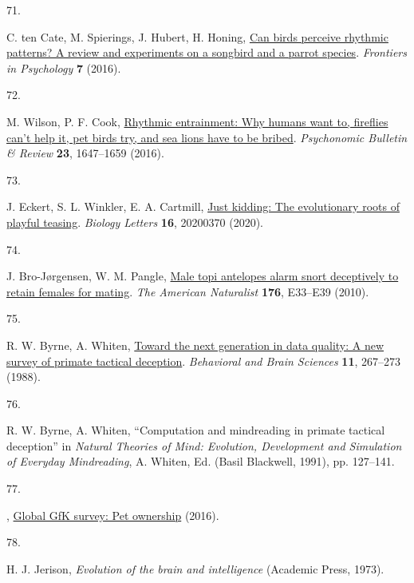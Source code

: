 \documentclass[
  man,floatsintext]{apa6}
\newlength{\cslhangindent}
\newlength{\csllabelwidth}
\newlength{\cslentryspacingunit} %
\newenvironment{CSLReferences}[2] %
 {%
  \setlength{\parindent}{0pt}
  \ifodd #1
  \let\oldpar\par
  \def\par{\hangindent=\cslhangindent\oldpar}
  \fi
  \setlength{\parskip}{#2\cslentryspacingunit}
 }%
 {}
\newcommand{\CSLLeftMargin}[1]{\parbox[t]{\csllabelwidth}{#1}}
\newcommand{\CSLRightInline}[1]{\parbox[t]{\linewidth - \csllabelwidth}{#1}\break}
\begin{document}
\begin{CSLReferences}{0}{0}
\leavevmode{}%
\CSLLeftMargin{71. }%
\CSLRightInline{C. ten Cate, M. Spierings, J. Hubert, H. Honing, \href{https://doi.org/10.3389/fpsyg.2016.00730}{Can birds perceive rhythmic patterns? A review and experiments on a songbird and a parrot species}. \emph{Frontiers in Psychology} \textbf{7} (2016).}

\leavevmode{}%
\CSLLeftMargin{72. }%
\CSLRightInline{M. Wilson, P. F. Cook, \href{https://doi.org/10.3758/s13423-016-1013-x}{Rhythmic entrainment: Why humans want to, fireflies can't help it, pet birds try, and sea lions have to be bribed}. \emph{Psychonomic Bulletin \& Review} \textbf{23}, 1647--1659 (2016).}

\leavevmode{}%
\CSLLeftMargin{73. }%
\CSLRightInline{J. Eckert, S. L. Winkler, E. A. Cartmill, \href{https://doi.org/10.1098/rsbl.2020.0370}{Just kidding: The evolutionary roots of playful teasing}. \emph{Biology Letters} \textbf{16}, 20200370 (2020).}

\leavevmode{}%
\CSLLeftMargin{74. }%
\CSLRightInline{J. Bro-Jørgensen, W. M. Pangle, \href{https://doi.org/10.1086/653078}{Male topi antelopes alarm snort deceptively to retain females for mating}. \emph{The American Naturalist} \textbf{176}, E33--E39 (2010).}

\leavevmode{}%
\CSLLeftMargin{75. }%
\CSLRightInline{R. W. Byrne, A. Whiten, \href{https://doi.org/10.1017/S0140525X00049955}{Toward the next generation in data quality: A new survey of primate tactical deception}. \emph{Behavioral and Brain Sciences} \textbf{11}, 267--273 (1988).}

\leavevmode{}%
\CSLLeftMargin{76. }%
\CSLRightInline{R. W. Byrne, A. Whiten, {``Computation and mindreading in primate tactical deception''} in \emph{Natural Theories of Mind: Evolution, Development and Simulation of Everyday Mindreading}, A. Whiten, Ed. (Basil Blackwell, 1991), pp. 127--141.}

\leavevmode{}%
\CSLLeftMargin{77. }%
\CSLRightInline{, \href{http://www.gfk.com/global-studies/global-studies-pet-ownership}{Global GfK survey: Pet ownership} (2016).}

\leavevmode{}%
\CSLLeftMargin{78. }%
\CSLRightInline{H. J. Jerison, \emph{Evolution of the brain and intelligence} (Academic Press, 1973).}


\end{CSLReferences}
\end{document}
